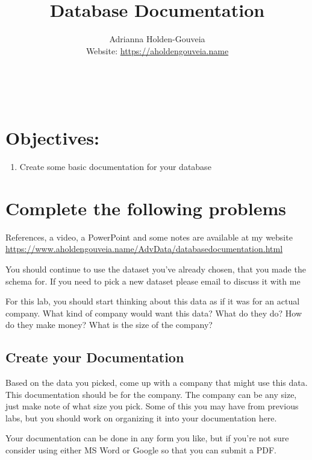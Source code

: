 \documentclass[12pt]{article}
\title{Database Documentation}
\author{
        Adrianna Holden-Gouveia \\
        Website: \url{https://aholdengouveia.name}\\ 
        \date{\vspace{-5ex}}
        \faLinkedin{: aholdengouveia} \\
        \faGithub {: aholdengouveia} \\
        }
\begin{document}
    

\maketitle


\section*{Objectives:}
\begin{enumerate}
    \item Create some basic documentation for your database
\end{enumerate}
\section*{Complete the following problems}

References, a video, a PowerPoint and some notes are available at my website
\url {https://www.aholdengouveia.name/AdvData/databasedocumentation.html}

You should continue to use the dataset you've already chosen, that you made the schema for. If you need to pick a new dataset please email to discuss it with me

For this lab, you should start thinking about this data as if it was for an actual company.  What kind of company would want this data? What do they do? How do they make money? What is the size of the company?

\subsection*{Create your Documentation}

Based on the data you picked, come up with a company that might use this data.  This documentation should be for the company.  The company can be any size, just make note of what size you pick. Some of this you may have from previous labs, but you should work on organizing it into your documentation here. 

Your documentation can be done in any form you like, but if you're not sure consider using either MS Word or Google so that you can submit a PDF.  
\end{document}
